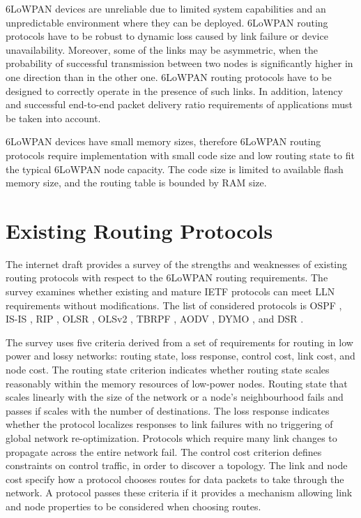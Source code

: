 6LoWPAN devices are unreliable due to limited system capabilities and an unpredictable environment where they can be deployed. 6LoWPAN routing protocols have to be robust to dynamic loss caused by link failure or device unavailability. Moreover, some of the links may be asymmetric, when the probability of successful transmission between two nodes is significantly higher in one direction than in the other one. 6LoWPAN routing protocols have to be designed to correctly operate in the presence of such links.  In addition, latency and successful end-to-end packet delivery ratio requirements of applications must be taken into account.

6LoWPAN devices have small memory sizes, therefore 6LoWPAN routing protocols require implementation with small code size and low routing state to fit the typical 6LoWPAN node capacity. The code size is limited to available flash memory size, and the routing table is bounded by RAM size. 

\section{Existing Routing Protocols}\label{sec:rout.protocols}
The internet draft \cite{draft-protocols-07} provides a survey of the strengths and weaknesses of existing routing protocols with respect to the 6LoWPAN routing requirements. The survey examines whether existing and mature IETF protocols can meet LLN requirements without modifications. The list of considered protocols is OSPF \cite{rfc2328}, IS-IS \cite{rfc1142}, RIP \cite{rfc2453}, OLSR \cite{rfc3626}, OLSv2 \cite{draft-manet-olsrv2}, TBRPF \cite{rfc3684}, AODV \cite{rfc3561}, DYMO \cite{draft-manet-dymo}, and DSR \cite{rfc4728}. 

The survey uses five criteria derived from a set of requirements for routing in low power and lossy networks:  routing state, loss response, control cost, link cost, and node cost. The routing state criterion indicates whether routing state scales reasonably within the memory resources of low-power nodes. Routing state that scales linearly with the size of the network or a node's neighbourhood fails and passes if scales with the number of destinations. The loss response indicates whether the protocol localizes responses to link failures with no triggering of global network re-optimization. Protocols which require many link changes to propagate across the entire network fail. The control cost criterion defines constraints on control traffic, in order to discover a topology. The link and node cost specify how a protocol chooses routes for data packets to take through the network. A protocol passes these criteria if it provides a mechanism allowing link and node properties to be considered when choosing routes.

